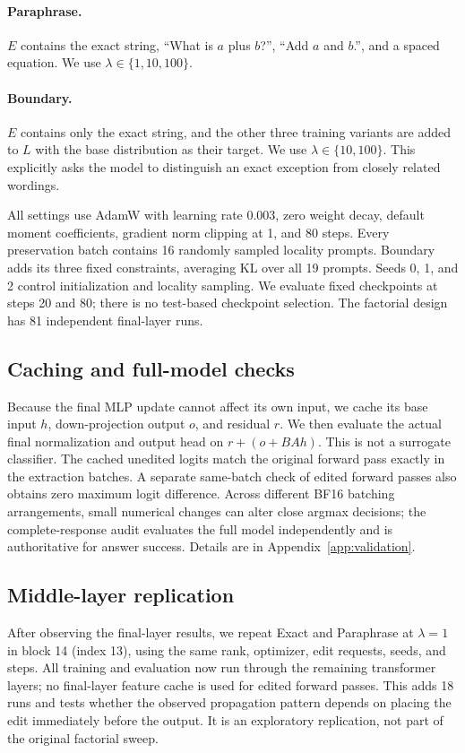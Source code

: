 \documentclass[10pt,twocolumn]{article}
\begin{document}
\paragraph{Paraphrase.} $E$ contains the exact string, ``What is $a$ plus $b$?'', ``Add $a$ and $b$.'', and a spaced equation. We use $\lambda\in\{1,10,100\}$.
\paragraph{Boundary.} $E$ contains only the exact string, and the other three training variants are added to $L$ with the base distribution as their target. We use $\lambda\in\{10,100\}$. This explicitly asks the model to distinguish an exact exception from closely related wordings.

All settings use AdamW with learning rate 0.003, zero weight decay, default moment coefficients, gradient norm clipping at 1, and 80 steps. Every preservation batch contains 16 randomly sampled locality prompts. Boundary adds its three fixed constraints, averaging KL over all 19 prompts. Seeds 0, 1, and 2 control initialization and locality sampling. We evaluate fixed checkpoints at steps 20 and 80; there is no test-based checkpoint selection. The factorial design has 81 independent final-layer runs.

\subsection{Caching and full-model checks}
Because the final MLP update cannot affect its own input, we cache its base input $h$, down-projection output $o$, and residual $r$. We then evaluate the actual final normalization and output head on $r+(o+BAh)$. This is not a surrogate classifier. The cached unedited logits match the original forward pass exactly in the extraction batches. A separate same-batch check of edited forward passes also obtains zero maximum logit difference. Across different BF16 batching arrangements, small numerical changes can alter close argmax decisions; the complete-response audit evaluates the full model independently and is authoritative for answer success. Details are in Appendix~\ref{app:validation}.

\subsection{Middle-layer replication}
After observing the final-layer results, we repeat Exact and Paraphrase at $\lambda=1$ in block 14 (index 13), using the same rank, optimizer, edit requests, seeds, and steps. All training and evaluation now run through the remaining transformer layers; no final-layer feature cache is used for edited forward passes. This adds 18 runs and tests whether the observed propagation pattern depends on placing the edit immediately before the output. It is an exploratory replication, not part of the original factorial sweep.
\end{document}
